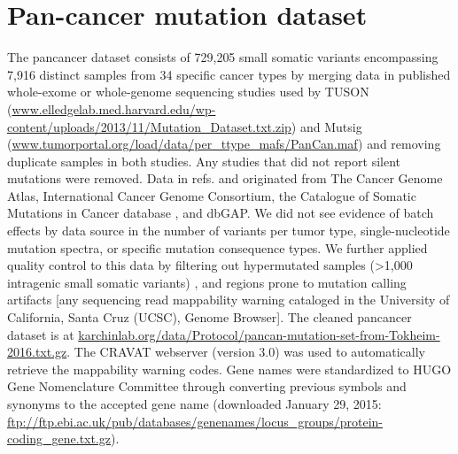 \appendix

\begingroup             
\let\clearpage\relax

\chapter{Pan-cancer mutation dataset}
\label{app:pancan_mutations}

The pancancer dataset consists of 729,205 small somatic variants encompassing 7,916 distinct samples from 34 specific cancer types by merging data in published whole-exome or whole-genome sequencing studies used by TUSON (\url{www.elledgelab.med.harvard.edu/wp-content/uploads/2013/11/Mutation_Dataset.txt.zip}) \cite{RN71} and Mutsig (\url{www.tumorportal.org/load/data/per_ttype_mafs/PanCan.maf}) \cite{RN14} and removing duplicate samples in both studies. Any studies that did not report silent mutations were removed. Data in refs. \cite{RN71} and \cite{RN14} originated from The Cancer Genome Atlas, International Cancer Genome Consortium, the Catalogue of Somatic Mutations in Cancer database \cite{RN97}, and dbGAP. We did not see evidence of batch effects by data source in the number of variants per tumor type, single-nucleotide mutation spectra, or specific mutation consequence types. We further applied quality control to this data by filtering out hypermutated samples (>1,000 intragenic small somatic variants) \cite{RN25}, and regions prone to mutation calling artifacts [any sequencing read mappability warning cataloged in the University of California, Santa Cruz (UCSC), Genome Browser]. The cleaned pancancer dataset is at \url{karchinlab.org/data/Protocol/pancan-mutation-set-from-Tokheim-2016.txt.gz}. The CRAVAT webserver (version 3.0) was used to automatically retrieve the mappability warning codes. Gene names were standardized to HUGO Gene Nomenclature Committee through converting previous symbols and synonyms to the accepted gene name (downloaded January 29, 2015: \url{ftp://ftp.ebi.ac.uk/pub/databases/genenames/locus_groups/protein-coding_gene.txt.gz}). 

\endgroup